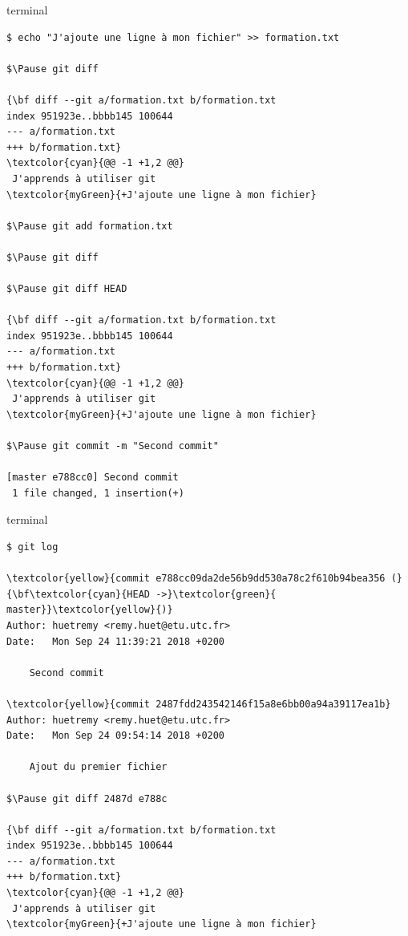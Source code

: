 \documentclass[usepdftitle=false]{beamer}
\def\seplength{.3\topsep}
\newcommand{\Pause}{%
\ifdef{\Release}
  {\pause}
  {}
}
\begin{document}
\begin{frame}[fragile]
	\begin{beamercolorbox}[rounded=true,shadow=true]{terminal}
\vspace{-\seplength}
\begin{Verbatim}
$ echo "J'ajoute une ligne à mon fichier" >> formation.txt

$\Pause git diff

{\bf diff --git a/formation.txt b/formation.txt
index 951923e..bbbb145 100644
--- a/formation.txt
+++ b/formation.txt}
\textcolor{cyan}{@@ -1 +1,2 @@}
 J'apprends à utiliser git
\textcolor{myGreen}{+J'ajoute une ligne à mon fichier}

$\Pause git add formation.txt

$\Pause git diff

$\Pause git diff HEAD

{\bf diff --git a/formation.txt b/formation.txt
index 951923e..bbbb145 100644
--- a/formation.txt
+++ b/formation.txt}
\textcolor{cyan}{@@ -1 +1,2 @@}
 J'apprends à utiliser git
\textcolor{myGreen}{+J'ajoute une ligne à mon fichier}

$\Pause git commit -m "Second commit"

[master e788cc0] Second commit
 1 file changed, 1 insertion(+)

\end{Verbatim}
	\end{beamercolorbox}
\end{frame}

\begin{frame}[fragile]
	\begin{beamercolorbox}[rounded=true,shadow=true]{terminal}
\vspace{-\seplength}
		\begin{Verbatim}
$ git log

\textcolor{yellow}{commit e788cc09da2de56b9dd530a78c2f610b94bea356 (}{\bf\textcolor{cyan}{HEAD ->}\textcolor{green}{ master}}\textcolor{yellow}{)}
Author: huetremy <remy.huet@etu.utc.fr>
Date:   Mon Sep 24 11:39:21 2018 +0200

    Second commit

\textcolor{yellow}{commit 2487fdd243542146f15a8e6bb00a94a39117ea1b}
Author: huetremy <remy.huet@etu.utc.fr>
Date:   Mon Sep 24 09:54:14 2018 +0200

    Ajout du premier fichier

$\Pause git diff 2487d e788c

{\bf diff --git a/formation.txt b/formation.txt
index 951923e..bbbb145 100644
--- a/formation.txt
+++ b/formation.txt}
\textcolor{cyan}{@@ -1 +1,2 @@}
 J'apprends à utiliser git
\textcolor{myGreen}{+J'ajoute une ligne à mon fichier}
    		
		\end{Verbatim}
	\end{beamercolorbox}
\end{frame}
\end{document}
